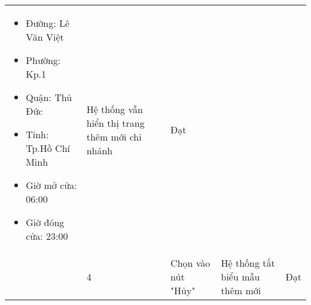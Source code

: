 {\begin{longtable}{| p{2.5cm}| p{1cm}| p{5.5cm}| p{4.5cm} | p{1.5cm} |}
\begin{itemize}
            \item Đường: Lê Văn Việt
            \item Phường: Kp.1
            \item Quận: Thủ Đức 
            \item Tỉnh: Tp.Hồ Chí Minh
            \item Giờ mở cửa: 06:00
            \item Giờ đóng cửa: 23:00
        \end{itemize} & Hệ thống vẫn hiển thị trang thêm mới chi nhánh & Đạt \\
        \cline{2-5}
         & 4 & Chọn vào nút "Hủy" & Hệ thống tắt biểu mẫu thêm mới & Đạt \\
        \hline
    \end{longtable} 
}


